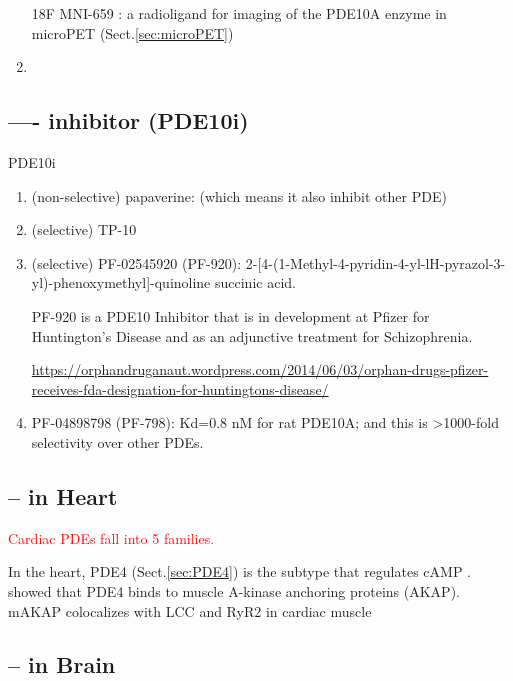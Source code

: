 \begin{enumerate}
  \item  [18F]MNI-659 : a radioligand for imaging of the
PDE10A enzyme in microPET (Sect.\ref{sec:microPET})
 
  \item 
\end{enumerate}

\subsection{---- inhibitor (PDE10i)}
\label{sec:PDE10-inhibitor}

PDE10i 
\begin{enumerate}

  \item (non-selective) papaverine: (which means it also inhibit other PDE)
  
  \item (selective) TP-10
  
  \item (selective) PF-02545920 (PF-920):
  2-[4-(1-Methyl-4-pyridin-4-yl-lH-pyrazol-3-yl)-phenoxymethyl]-quinoline
  succinic acid.
  
PF-920 is a PDE10 Inhibitor that is in development at Pfizer for
Huntington's Disease and as an adjunctive treatment for Schizophrenia.

\url{https://orphandruganaut.wordpress.com/2014/06/03/orphan-drugs-pfizer-receives-fda-designation-for-huntingtons-disease/} 
 
 \item PF-04898798 (PF-798): Kd=0.8 nM for rat PDE10A; and this is >1000-fold
 selectivity over other PDEs.
\end{enumerate}

\subsection{-- in Heart}

\textcolor{red}{Cardiac PDEs fall into 5 families.}
\label{sec:PDE-heart}

In the heart, PDE4 (Sect.\ref{sec:PDE4}) is the subtype that regulates cAMP
\citep{Lehnart2005}. \citep{Dodge2001} showed that PDE4 binds to muscle A-kinase
anchoring proteins (AKAP). mAKAP colocalizes with LCC and RyR2 in cardiac muscle \citep{Ruehr2003,
Yang1998}

\subsection{-- in Brain}
\label{sec:PDE-brain}


